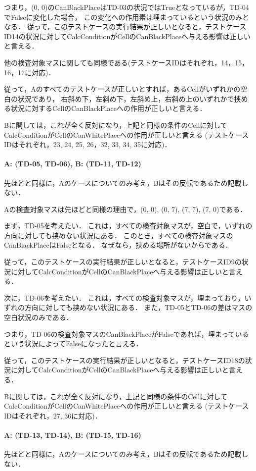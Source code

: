 \documentclass[platex,dvipdfmx,12pt]{jsarticle}
\begin{document}
つまり，(0, 0)のCanBlackPlaceはTD-03の状況ではTrueとなっているが，TD-04でFalseに変化した場合，
この変化への作用素は埋まっているという状況のみとなる．
従って，このテストケースの実行結果が正しいとなると，テストケースID14の状況に対してCalcConditionがCellのCanBlackPlaceへ与える影響は正しいと言える．

他の検査対象マスに関しても同様である(テストケースIDはそれぞれ，14，15，16，17に対応)．

従って，Aのすべてのテストケースが正しいとすれば，あるCellがいずれかの空白の状況であり，
右斜め下，左斜め下，左斜め上，右斜め上のいずれかで挟める状況に対するCellのCanBlackPlaceへの作用が正しいと言える．

Bに関しては，これが全く反対になり，上記と同様の条件のCellに対してCalcConditionがCellのCanWhitePlaceへの作用が正しいと言える
(テストケースIDはそれぞれ，23, 24, 25, 26，32, 33, 34, 35に対応)．


\paragraph{A: (TD-05, TD-06), B: (TD-11, TD-12)}
先ほどと同様に，Aのケースについてのみ考え，Bはその反転であるため記載しない．

Aの検査対象マスは先ほどと同様の理由で，(0, 0), (0, 7), (7, 7), (7, 0)である．

まず，TD-05を考えたい．
これは，すべての検査対象マスが，空白で，いずれの方向に対しても挟めない状況にある．
このとき，すべての検査対象マスのCanBlackPlaceはFalseとなる．
なぜなら，挟める場所がないからである．

従って，このテストケースの実行結果が正しいとなると，テストケースID9の状況に対してCalcConditionがCellのCanBlackPlaceへ与える影響は正しいと言える．

次に，TD-06を考えたい．
これは，すべての検査対象マスが，埋まっており，いずれの方向に対しても挟めない状況にある．
また，TD-05とTD-06の差はマスの空白状況のみである．

つまり，TD-06の検査対象マスのCanBlackPlaceがFalseであれば，埋まっているという状況によってFalseになったと言える．

従って，このテストケースの実行結果が正しいとなると，テストケースID18の状況に対してCalcConditionがCellのCanBlackPlaceへ与える影響は正しいと言える．

Bに関しては，これが全く反対になり，上記と同様の条件のCellに対してCalcConditionがCellのCanWhitePlaceへの作用が正しいと言える
(テストケースIDはそれぞれ，27, 36に対応)．

\paragraph{A: (TD-13, TD-14), B: (TD-15, TD-16)}
先ほどと同様に，Aのケースについてのみ考え，Bはその反転であるため記載しない．
\end{document}
